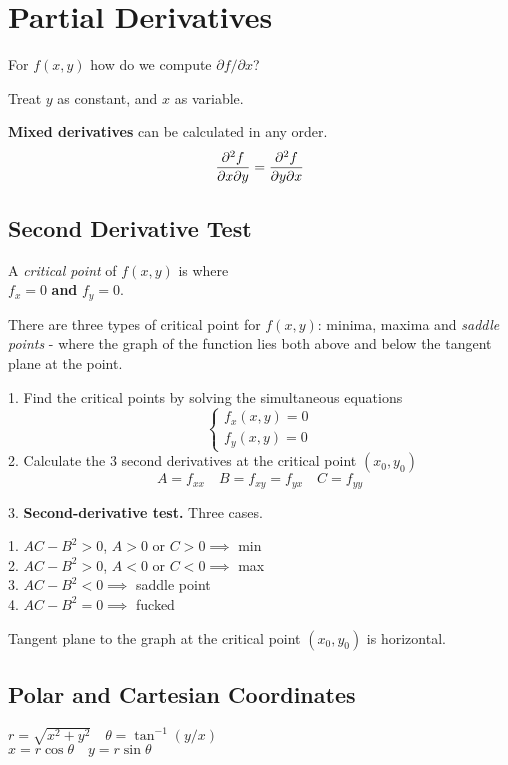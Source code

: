 \section{Partial Derivatives}

For $f(x,y)$ how do we compute $\partial f / \partial x$?

Treat $y$ as constant, and $x$ as variable.

\textbf{Mixed derivatives} can be calculated in any order.
\begin{equation*}
    \pdv{f}{x}{y} = \pdv{f}{y}{x}
\end{equation*}

\subsection*{Second Derivative Test}

A \textit{critical point} of $f(x,y)$ is where \\
$f_x = 0$ \textbf{and} $f_y = 0$.

There are three types of critical point for $f(x,y)$: minima, maxima and \textit{saddle points} - where the graph
of the function lies both above and below the tangent plane at the point.
\vspace{\baselineskip}

1. Find the critical points by solving the simultaneous equations
\begin{equation*}
\begin{cases}
    f_x(x,y) = 0 \\
    f_y(x,y) = 0
\end{cases}
\end{equation*}
2. Calculate the 3 second derivatives at the critical point $(x_0, y_0)$
\begin{equation*}
    A = f_{xx} \quad B = f_{xy} = f_{yx} \quad C = f_{yy}
\end{equation*}

3. \textbf{Second-derivative test.} Three cases.

1. $AC - B^2 > 0$, $A > 0$ or $C > 0 \implies$ min \\
2. $AC - B^2 > 0$, $A < 0$ or $C < 0 \implies$ max \\
3. $AC - B^2 < 0 \implies$ saddle point \\
4. $AC - B^2 = 0 \implies$ fucked

Tangent plane to the graph at the critical point $(x_0, y_0)$ is horizontal.

\subsection*{Polar and Cartesian Coordinates}

$r = \sqrt{x^2 + y^2} \quad \theta = \tan^{-1} (y/x)$ \\
$x = r \cos \theta \quad y = r \sin \theta$